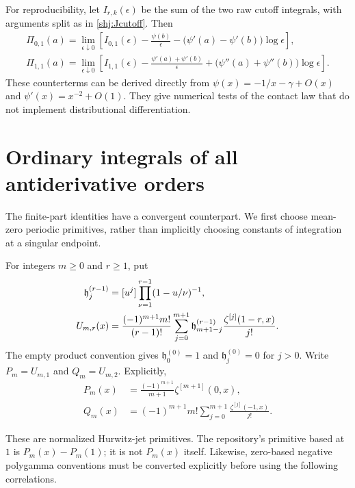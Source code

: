 For reproducibility, let $I_{r,k}(\epsilon)$ be the sum of the two raw cutoff integrals, with arguments split as in \eqref{shj:Jcutoff}. Then
\begin{align}
\Pi_{0,1}(a)=\lim_{\epsilon\downarrow0}\left[
I_{0,1}(\epsilon)-\frac{\psi(b)}\epsilon
-\big(\psi'(a)-\psi'(b)\big)\log\epsilon\right],\label{shj:cut01}\\
\Pi_{1,1}(a)=\lim_{\epsilon\downarrow0}\left[
I_{1,1}(\epsilon)-\frac{\psi'(a)+\psi'(b)}\epsilon
+\big(\psi''(a)+\psi''(b)\big)\log\epsilon\right].\label{shj:cut11}
\end{align}
These counterterms can be derived directly from $\psi(x)=-1/x-\gamma+O(x)$ and $\psi'(x)=x^{-2}+O(1)$. They give numerical tests of the contact law that do not implement distributional differentiation.

\section{Ordinary integrals of all antiderivative orders}\label{shj:primitives}
The finite-part identities have a convergent counterpart. We first choose mean-zero periodic primitives, rather than implicitly choosing constants of integration at a singular endpoint.

\begin{definition}\label{shj:Udef}
For integers $m\ge0$ and $r\ge1$, put
\begin{align}
\mathfrak h_j^{(r-1)}&=[u^j]\prod_{\nu=1}^{r-1}(1-u/\nu)^{-1},\notag\\
U_{m,r}(x)&=\frac{(-1)^{m+1}m!}{(r-1)!}
\sum_{j=0}^{m+1}\mathfrak h_{m+1-j}^{(r-1)}
\frac{\zeta^{[j]}(1-r,x)}{j!}.
\label{shj:Uformula}
\end{align}
The empty product convention gives $\mathfrak h_0^{(0)}=1$ and $\mathfrak h_j^{(0)}=0$ for $j>0$. Write $P_m=U_{m,1}$ and $Q_m=U_{m,2}$. Explicitly,
\begin{align}
P_m(x)&=\frac{(-1)^{m+1}}{m+1}\zeta^{[m+1]}(0,x),\label{shj:P}\\
Q_m(x)&=(-1)^{m+1}m!\sum_{j=0}^{m+1}\frac{\zeta^{[j]}(-1,x)}{j!}.
\label{shj:Q}
\end{align}
\end{definition}
These are normalized Hurwitz-jet primitives. The repository's primitive based at $1$ is $P_m(x)-P_m(1)$; it is not $P_m(x)$ itself. Likewise, zero-based negative polygamma conventions must be converted explicitly before using the following correlations.

